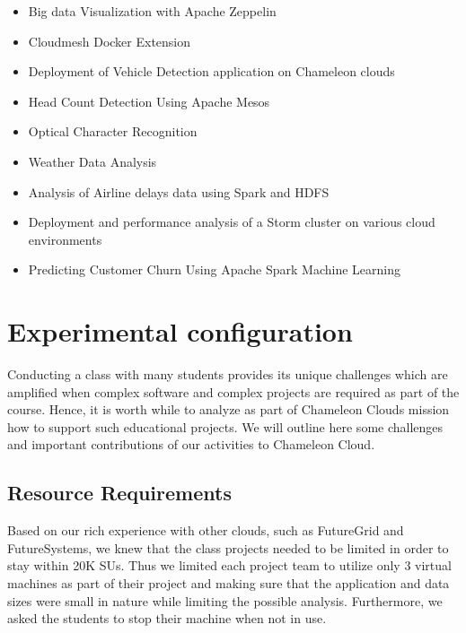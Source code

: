 \documentclass[sigconf]{acmart}
\begin{document}
\begin{itemize}
\item Big data Visualization with Apache Zeppelin

\item Cloudmesh Docker Extension

\item Deployment of Vehicle Detection application on Chameleon clouds

\item Head Count Detection Using Apache Mesos

\item Optical Character Recognition

\item Weather Data Analysis

\item Analysis of Airline delays data using Spark and HDFS

\item Deployment and performance analysis of a Storm cluster on various cloud environments 

\item Predicting Customer Churn Using Apache Spark Machine Learning 

\end{itemize}

\section{Experimental configuration}

Conducting a class with many students provides its unique challenges
which are amplified when complex software and complex projects are
required as part of the course. Hence, it is worth while to analyze as
part of Chameleon Clouds mission how to support such educational projects. We
will outline here some challenges and important contributions of our
activities to Chameleon Cloud.

\subsection{Resource Requirements}

Based on our rich experience with other clouds, such as FutureGrid
and FutureSystems, we knew that the class projects needed to be limited
in order to stay within 20K SUs. Thus we limited each project team to
utilize only 3 virtual machines as part of their project and making
sure that the application and data sizes were small in nature while
limiting the possible analysis. Furthermore, we asked the students to
stop their machine when not in use.
\end{document}
